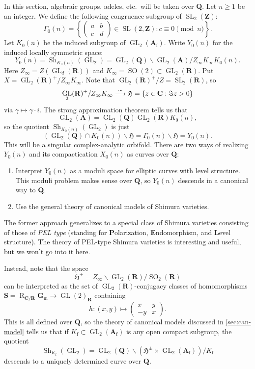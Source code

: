 \documentclass[11pt]{article}
\DeclareMathOperator{\GL}{GL}
\DeclareMathOperator{\restrict}{R}
\DeclareMathOperator{\shimura}{Sh}
\DeclareMathOperator{\SL}{SL}
\DeclareMathOperator{\SO}{SO}
\newcommand{\dA}{\mathbf{A}}
\newcommand{\dC}{\mathbf{C}}
\newcommand{\dG}{\mathbf{G}}
\newcommand{\dR}{\mathbf{R}}
\newcommand{\dQ}{\mathbf{Q}}
\newcommand{\dS}{\mathbf{S}}
\newcommand{\dZ}{\mathbf{Z}}
\newcommand{\fH}{\mathfrak{H}}
\newcommand{\finite}{\mathrm{f}}
\newcommand{\iso}{\xlongrightarrow\sim}
\newcommand{\mult}{\mathrm{m}}
\begin{document}
In this section, algebraic groups, adeles, etc.~will be taken over $\dQ$. 
Let $n\geqslant 1$ be an integer. We define the following congruence subgroup 
of $\SL_2(\dZ)$:
\[
  \Gamma_0(n) = \left\{\begin{pmatrix}a & b \\ c & d \end{pmatrix}\in \SL(2,\dZ) : c\equiv 0\pmod n\right\} .
\]
Let $K_0(n)$ be the induced subgroup of $\GL_2(\dA_\finite)$. Write $Y_0(n)$ 
for the induced locally symmetric space: 
\[
  Y_0(n) = \shimura_{K_0(n)}(\GL_2) = \GL_2(\dQ)\backslash \GL_2(\dA) / Z_\infty K_\infty K_0(n) .
\]
Here $Z_\infty=Z(\GL_d(\dR))$ and $K_\infty=\SO(2)\subset \GL_2(\dR)$. Put 
$X=\GL_2(\dR)^+/Z_\infty K_\infty$. Note that $\GL_2(\dR)^+/Z = \SL_2(\dR)$, so 
\[
  \GL_2(\dR)^+ / Z_\infty K_\infty \iso \fH = \{z\in \dC:\Im z>0\} 
\]
via $\gamma\mapsto \gamma\cdot i$. The strong approximation theorem tells us 
that 
\[
  \GL_2(\dA) = \GL_2(\dQ) \GL_2(\dR) K_0(n),
\]
so the quotient $\shimura_{K_0(n)}(\GL_2)$ is just 
\[
  (\GL_2(\dQ)\cap K_0(n))\backslash \fH = \Gamma_0(n) \backslash \fH = Y_0(n).
\]
This will be a singular complex-analytic orbifold. There are two ways of 
realizing $Y_0(n)$ and its compactication $X_0(n)$ as curves over $\dQ$: 
\begin{enumerate}
  \item Interpret $Y_0(n)$ as a moduli space for elliptic curves with level 
    structure. This moduli problem makes sense over $\dQ$, so $Y_0(n)$ descends 
    in a canonical way to $\dQ$. 
  \item Use the general theory of canonical models of Shimura varieties. 
\end{enumerate}
The former approach generalizes to a special class of Shimura varieties 
consisting of those of \emph{PEL type} (standing for 
\textbf{P}olarization, \textbf{E}ndomorphism, and \textbf{L}evel structure). 
The theory of PEL-type Shimura varieties is interesting and useful, but we 
won't go into it here. 

Instead, note that the space 
\[
  \fH^\pm = Z_\infty \backslash \GL_2(\dR) / \SO_2(\dR) 
\]
can be interpreted as the set of $\GL_2(\dR)$-conjugacy classes of 
homomorphisms $\dS=\restrict_{\dC/\dR}\dG_\mult\to \GL(2)_\dR$ containing 
\[
  h:(x,y)\mapsto \begin{pmatrix} x & y \\ -y & x \end{pmatrix} .
\]
This is all defined over $\dQ$, so the theory of canonical models discussed 
in \autoref{sec:can-model} tells us that if 
$K_\finite\subset\GL_2(\dA_\finite)$ is any open compact subgroup, the quotient 
\[
  \shimura_{K_\finite}(\GL_2) = \GL_2(\dQ)\backslash (\fH^\pm\times \GL_2(\dA_\finite))/K_\finite
\]
descends to a uniquely determined curve over $\dQ$. 
\end{document}
